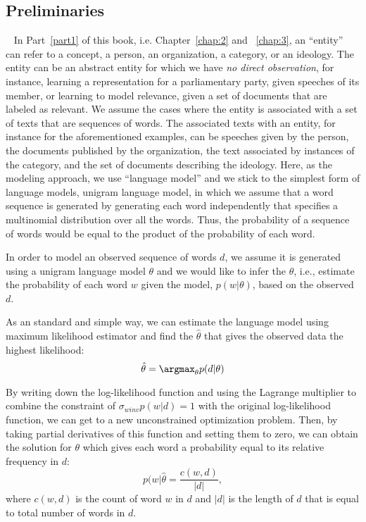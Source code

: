 \subsection{Preliminaries}
~\label{chap2_preliminaries}
In Part~\ref{part1} of this book, i.e. Chapter~\ref{chap:2} and ~\ref{chap:3}, an ``entity'' can refer to a concept, a person, an organization, a category, or an ideology. The entity can be an abstract entity for which we have \emph{no direct observation}, for instance, learning a representation for a parliamentary party, given speeches of its member, or learning to model relevance, given a set of documents that are labeled as relevant.
We assume the cases where the entity is associated with a set of texts that are sequences of words. The associated texts with an entity, for instance for the aforementioned examples, can be speeches given by the person, the documents published by the organization, the text associated by instances of the category, and the set of documents describing the ideology.
%
%
Here, as the modeling approach, we use ``language model'' and we stick to the simplest form of language models, unigram language model, in which we assume that a word sequence is generated by generating each word independently that specifies a multinomial distribution over all the words. Thus, the probability of a sequence of words would be equal to the product of the probability of each word.  

In order to model an observed sequence of words $d$, we assume it is generated using a unigram language model $\theta$ and we would like to infer the $\theta$, i.e., estimate the probability of each word $w$ given the model, $p(w|\theta)$, based on the observed $d$. 

As an standard and simple way, we can estimate the language model using maximum likelihood estimator and find the $\hat{\theta}$ that gives the observed data the highest likelihood:
\begin{equation}
\hat{\theta} = \argmax_\theta p(d|\theta)
\end{equation}

By writing down the log-likelihood function and using the Lagrange multiplier to combine the constraint of $\sigma_{w in v}p(w|d) =1$ with the original log-likelihood function, we can get to a new unconstrained optimization problem. Then, by taking partial derivatives of this function and setting them to zero, we can obtain the solution for $\theta$ which gives each word a probability equal to its relative frequency in $d$:
\begin{equation}
    p(w|\hat{\theta} = \frac{c(w, d)}{|d|},
\end{equation}
where $c(w, d)$ is the count of word $w$ in $d$ and $|d|$ is the length of $d$ that is equal to total number of words in $d$.

